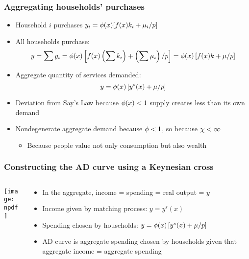 \documentclass[11pt,aspectratio=169,xcolor={dvipsnames},hyperref={pdftex,pdfpagemode=UseNone,hidelinks,pdfdisplaydoctitle=true},usepdftitle=false]{beamer}
\newcommand{\npdf}{../figures/figures2.pdf}
\begin{document}
\begin{frame}
\end{frame}

\begin{frame}
\frametitle{Aggregating households' purchases}
\begin{itemize}
\item Household $i$ purchases $y_i = \phi(x) [f(x) k_i + \mu_i/p]$
\item All households purchase:
\begin{equation*}
 y = \sum y_i = \phi(x) \left[  f(x) \left( \sum k_i \right) + \left( \sum \mu_i \right)/p \right] = \phi(x) \left[  f(x) k + \mu/p \right]
\end{equation*}
\item Aggregate quantity of services demanded:
\begin{equation*}
y = \phi(x) \left[ y^s(x) + \mu/p \right]
\end{equation*}
\item Deviation from Say's Law because $\phi(x)<1$ \then supply creates less than its own demand
\item Nondegenerate aggregate demand because $\phi<1$, so because $\chi<\infty$
\begin{itemize}
\item Because people value not only consumption but also wealth
\end{itemize}
\end{itemize}
\end{frame}

\begin{frame}
\frametitle{Constructing the AD curve using a Keynesian cross}
\begin{columns}
\begin{column}{0.6\textwidth}
\texttt{[image: \\npdf]}%
\end{column}
\begin{column}{0.4\textwidth}
\begin{itemize}
	\item In the aggregate, income = spending = real output = $y$
	\item Income given by matching process: $y = y^s(x)$
	\item Spending chosen by households: $y = \phi(x) \left[ y^s(x) + \mu/p \right]$
	\item AD curve is aggregate spending chosen by households given that aggregate income = aggregate spending
\end{itemize}
\end{column}  
\end{columns} 
\end{frame}
\end{document}

